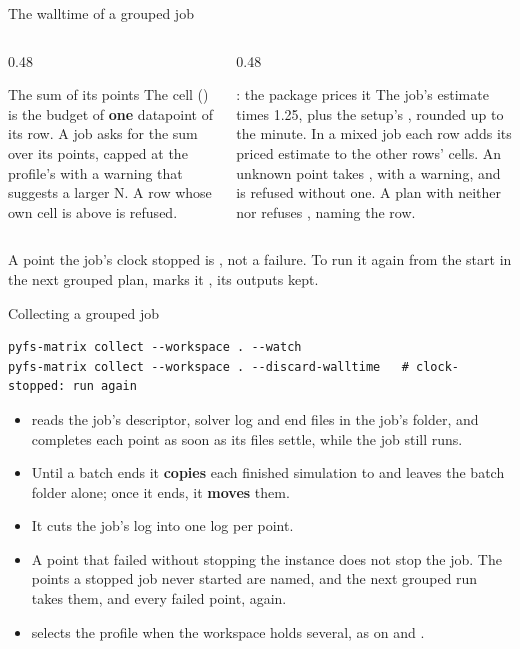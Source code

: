 \begin{frame}[fragile]{The walltime of a grouped job}
\begin{columns}[T]
\begin{column}{0.48\textwidth}
\begin{block}{The sum of its points}
\small The  cell () is the budget of \textbf{one}
datapoint of its row. A job asks for the sum over its points, capped at the
profile's  with a warning that suggests a larger N. A
row whose own cell is above  is refused.
\end{block}
\end{column}
\begin{column}{0.48\textwidth}
\begin{block}{: the package prices it}
\small The job's estimate times 1.25, plus the setup's
, rounded up to the minute. In a mixed job each
 row adds its priced estimate to the other rows' cells. An
unknown  point takes , with a warning, and
is refused without one. A plan with neither  nor
 refuses , naming the row.
\end{block}
\end{column}
\end{columns}
\begin{takeaway}A point the job's clock stopped is , not
a failure. To run it again from the start in the next grouped plan,
 marks it
, its outputs kept.\end{takeaway}
\end{frame}

\begin{frame}[fragile]{Collecting a grouped job}
\begin{lstlisting}[style=ftsbase]
pyfs-matrix collect --workspace . --watch
pyfs-matrix collect --workspace . --discard-walltime   # clock-stopped: run again
\end{lstlisting}
\begin{itemize}\small
  \item {} reads the job's descriptor, solver log and end files
        in the job's folder, and completes each point as soon as its files
        settle, while the job still runs.
  \item Until a batch ends it \textbf{copies} each finished simulation to
         and leaves the batch folder alone; once it ends, it
        \textbf{moves} them.
  \item It cuts the job's log into one log per point.
  \item A point that failed without stopping the instance does not stop the
        job. The points a stopped job never started are named, and the next
        grouped run takes them, and every failed point, again.
  \item {} selects the profile when the workspace holds
        several, as on  and .
\end{itemize}
\end{frame}

